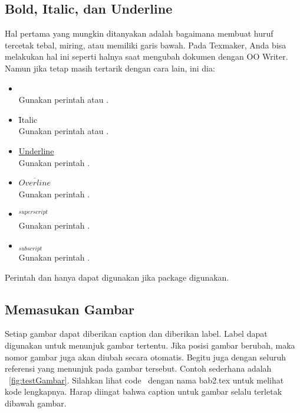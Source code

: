 \subsection{Bold, Italic, dan Underline}
Hal pertama yang mungkin ditanyakan adalah bagaimana membuat huruf tercetak
tebal, miring, atau memiliki garis bawah. Pada Texmaker, Anda bisa melakukan
hal ini seperti halnya saat mengubah dokumen dengan OO Writer. Namun jika tetap
masih tertarik dengan cara lain, ini dia:

\begin{itemize}
	\item {} \\
	Gunakan perintah  atau
	.
	\item \f{Italic} \\
	Gunakan perintah  atau
	.
	\item \underline{Underline} \\
	Gunakan perintah .
	\item $\overline{Overline}$ \\
	Gunakan perintah .
	\item $^{superscript}$ \\
	Gunakan perintah \code{\bslash{}$\lbrace\rbrace$}.
	\item $_{subscript}$ \\
	Gunakan perintah \code{\bslash{}\_$\lbrace\rbrace$}.
\end{itemize}

Perintah  dan  hanya dapat digunakan jika
package  digunakan.


\subsection{Memasukan Gambar}
Setiap gambar dapat diberikan caption dan diberikan label. Label dapat
digunakan untuk menunjuk gambar tertentu. Jika posisi gambar berubah, maka
nomor gambar juga akan diubah secara otomatis. Begitu juga dengan seluruh
referensi yang menunjuk pada gambar tersebut. Contoh sederhana adalah
\pic~\ref{fig:testGambar}. Silahkan lihat code \latex~dengan nama bab2.tex
untuk melihat kode lengkapnya. Harap diingat bahwa caption untuk gambar selalu
terletak dibawah gambar.

